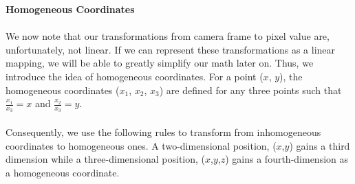 \documentclass[]{article}
\begin{document}
\textbf{Homogeneous Coordinates}\\\\
We now note that our transformations from camera frame to pixel value are, unfortunately, not linear. If we can represent these transformations as a linear mapping, we will be able to greatly simplify our math later on. Thus, we introduce the idea of homogeneous coordinates. For a point ($x$, $y$), the homogeneous coordinates ($x_1$, $x_2$, $x_3$) are defined for any three points such that  $\frac{x_1}{x_3} = x$ and $\frac{x_2}{x_3} = y$. \\\\ Consequently, we use the following rules to transform from inhomogeneous coordinates to homogeneous ones. A two-dimensional position, ($x$,$y$) gains a third dimension while a three-dimensional position, ($x$,$y$,$z$) gains a fourth-dimension as a homogeneous coordinate.\\\\
\end{document}
